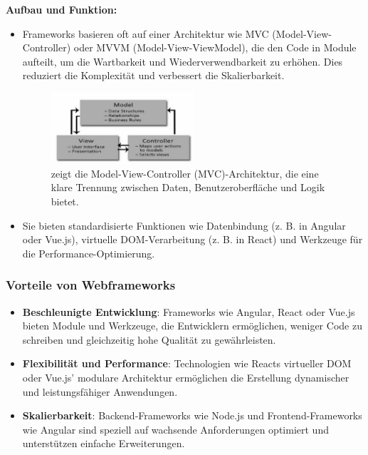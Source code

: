 \textbf{Aufbau und Funktion:}
\begin{itemize}
	\item Frameworks basieren oft auf einer Architektur wie MVC (Model-View-Controller) oder MVVM (Model-View-ViewModel), die den Code in Module aufteilt, um die Wartbarkeit und Wiederverwendbarkeit zu erhöhen. Dies reduziert die Komplexität und verbessert die Skalierbarkeit.\textit{\cite{madurapperuma2022state, rathinam2022analysis}}
	
	\begin{figure}
		\centering
		\includegraphics[width=0.5\textwidth]{images/MVC_architecture.png}
		\caption{zeigt die Model-View-Controller (MVC)-Architektur, die eine klare Trennung zwischen Daten, Benutzeroberfläche und Logik bietet. \textit{\cite{madurapperuma2022state}}}
	\end{figure}
	
	\item Sie bieten standardisierte Funktionen wie Datenbindung (z. B. in Angular oder Vue.js), virtuelle DOM-Verarbeitung (z. B. in React) und Werkzeuge für die Performance-Optimierung.\textit{\cite{awasthiresearch}}
\end{itemize}

\subsubsection{Vorteile von Webframeworks}
\begin{itemize}
	\item \textbf{Beschleunigte Entwicklung}: Frameworks wie Angular, React oder Vue.js bieten Module und Werkzeuge, die Entwicklern ermöglichen, weniger Code zu schreiben und gleichzeitig hohe Qualität zu gewährleisten.\textit{\cite{hutagikar2020analysis}}
	
	
	\item \textbf{Flexibilität und Performance}: Technologien wie Reacts virtueller DOM oder Vue.js’ modulare Architektur ermöglichen die Erstellung dynamischer und leistungsfähiger Anwendungen.\textit{\cite{shetty2020review}}
	
	\item \textbf{Skalierbarkeit}: Backend-Frameworks wie Node.js und Frontend-Frameworks wie Angular sind speziell auf wachsende Anforderungen optimiert und unterstützen einfache Erweiterungen.\textit{\cite{madurapperuma2022state}}
	
\end{itemize}


